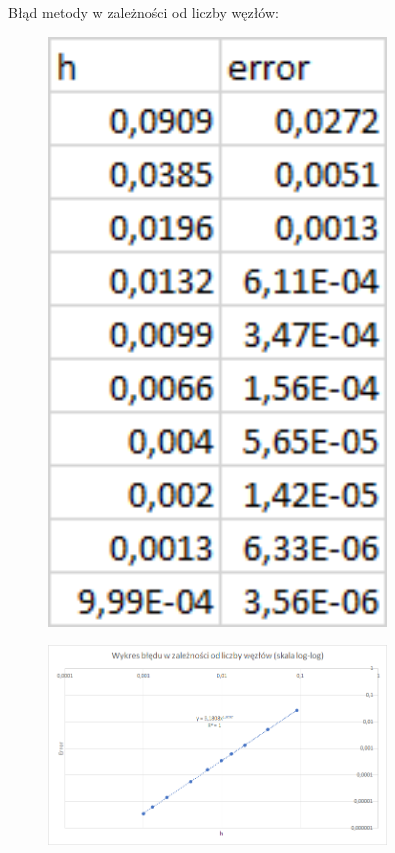 \newpage

\begin{samepage}
	Błąd metody w zależności od liczby węzłów:
	\begin{figure}[!ht]
		\begin{center}
			\includegraphics[width=0.8\textwidth]{Lab4/charts/zad4/3/error_dane.png}
		\end{center}
	\end{figure}
	\FloatBarrier
\end{samepage} 

\begin{samepage}
	
	\begin{figure}[!ht]
		\begin{center}
			\includegraphics[width=0.8\textwidth]{Lab4/charts/zad4/3/error.png}
		\end{center}
	\end{figure}
	\FloatBarrier
\end{samepage} 



